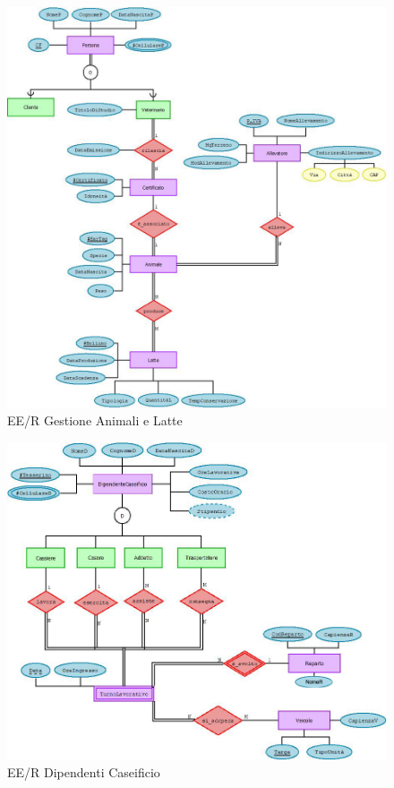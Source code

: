 \documentclass[12pt]{report}
\begin{document}
\begin{figure}[H]
\centering
\includegraphics[scale=0.70,angle=0]{imgs/eer_veterinario.jpeg}
\caption{EE/R Gestione Animali e Latte}
\end{figure}

\begin{figure}[H]
\centering
\includegraphics[scale=0.80,angle=90]{imgs/eer_dipendenti.jpeg}
\caption{EE/R Dipendenti Caseificio}
\end{figure}
\end{document}
